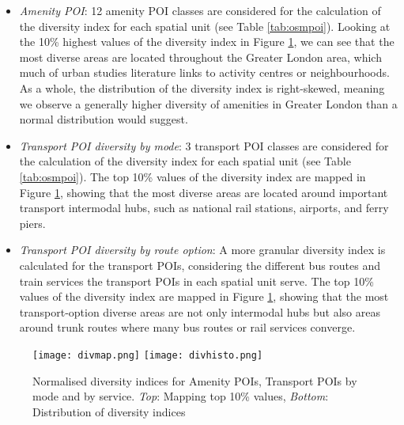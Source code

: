 \begin{itemize}
    \setlength\itemsep{0em}
    \item \textit{Amenity POI}: 12 amenity POI classes are considered for the calculation of the diversity index for each spatial unit (see Table \ref{tab:osmpoi}). Looking at the 10\% highest values of the diversity index in Figure \ref{fig:diversity}, we can see that the most diverse areas are located throughout the Greater London area, which much of urban studies literature links to activity centres or neighbourhoods. As a whole, the distribution of the diversity index is right-skewed, meaning we observe a generally higher diversity of amenities in Greater London than a normal distribution would suggest.
    \item \textit{Transport POI diversity by mode}: 3 transport POI classes are considered for the calculation of the diversity index for each spatial unit (see Table \ref{tab:osmpoi}). The top 10\% values of the diversity index are mapped in Figure \ref{fig:diversity}, showing that the most diverse areas are located around important transport intermodal hubs, such as national rail stations, airports, and ferry piers.
    \item \textit{Transport POI diversity by route option}: A more granular diversity index is calculated for the transport POIs, considering the different bus routes and train services the transport POIs in each spatial unit serve. The top 10\% values of the diversity index are mapped in Figure \ref{fig:diversity}, showing that the most transport-option diverse areas are not only intermodal hubs but also areas around trunk routes where many bus routes or rail services converge.
\end{itemize}

\begin{figure}[ht]
    \centering
    \texttt{[image: divmap.png]}
    \centering
    \texttt{[image: divhisto.png]}
    \captionsetup{justification=centering}
    \caption{Normalised diversity indices for Amenity POIs, Transport POIs by mode and by service. \textit{Top}: Mapping top 10\% values, \textit{Bottom}: Distribution of diversity indices}
    \label{fig:diversity}
\end{figure}

